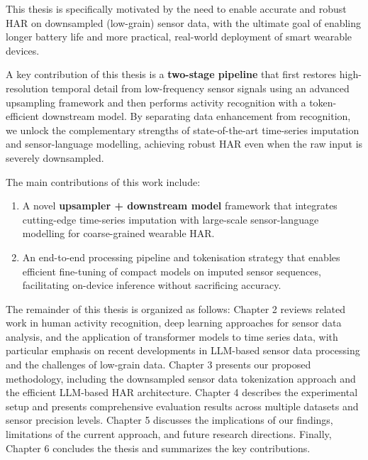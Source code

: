 This thesis is specifically motivated by the need to enable accurate and robust HAR on downsampled (low-grain) sensor data, with the ultimate goal of enabling longer battery life and more practical, real-world deployment of smart wearable devices.

A key contribution of this thesis is a \textbf{two-stage pipeline} that first restores high-resolution temporal detail from low-frequency sensor signals using an advanced upsampling framework and then performs activity recognition with a token-efficient downstream model. By separating data enhancement from recognition, we unlock the complementary strengths of state-of-the-art time-series imputation and sensor-language modelling, achieving robust HAR even when the raw input is severely downsampled.

The main contributions of this work include:
\begin{enumerate}
\item A novel \textbf{upsampler + downstream model} framework that integrates cutting-edge time-series imputation with large-scale sensor-language modelling for coarse-grained wearable HAR.
\item An end-to-end processing pipeline and tokenisation strategy that enables efficient fine-tuning of compact models on imputed sensor sequences, facilitating on-device inference without sacrificing accuracy.

\end{enumerate}

The remainder of this thesis is organized as follows: Chapter 2 reviews related work in human activity recognition, deep learning approaches for sensor data analysis, and the application of transformer models to time series data, with particular emphasis on recent developments in LLM-based sensor data processing and the challenges of low-grain data. Chapter 3 presents our proposed methodology, including the downsampled sensor data tokenization approach and the efficient LLM-based HAR architecture. Chapter 4 describes the experimental setup and presents comprehensive evaluation results across multiple datasets and sensor precision levels. Chapter 5 discusses the implications of our findings, limitations of the current approach, and future research directions. Finally, Chapter 6 concludes the thesis and summarizes the key contributions.